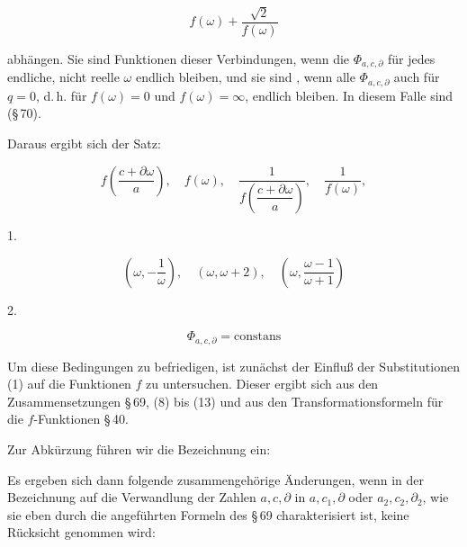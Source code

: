 
\[
f(\omega) + \frac{\sqrt{2}}{f(\omega)}
\]

abhängen. Sie sind  Funktionen dieser Verbindungen,
wenn die $\Phi_{a,c,\partial}$ für jedes endliche, nicht reelle $\omega$ endlich bleiben,
und sie sind , wenn alle $\Phi_{a,c,\partial}$ auch für $q = 0$, d.\,h.
für $f(\omega) = 0$ und $f(\omega) = \infty$, endlich bleiben. In diesem Falle
sind  (\S\,70).

Daraus ergibt sich der Satz:


\[
f\left(\frac{c+\partial\omega}{a}\right), \quad f(\omega), \quad \frac{1}{f\left(\dfrac{c+\partial\omega}{a}\right)}, \quad \frac{1}{f(\omega)},
\]


1. 

\[
\left(\omega, -\frac{1}{\omega}\right), \quad (\omega, \omega+2), \quad \left(\omega, \frac{\omega-1}{\omega+1}\right)
\]


2. 

\[
\Phi_{a,c,\partial} = \text{constans}
\]


Um diese Bedingungen zu befriedigen, ist zunächst der Einfluß
der Substitutionen (1) auf die Funktionen $f$ zu untersuchen.
Dieser ergibt sich aus den Zusammensetzungen \S\,69, (8) bis (13)
und aus den Transformationsformeln für die $f$-Funktionen \S\,40.

Zur Abkürzung führen wir die Bezeichnung ein:


Es ergeben sich dann folgende zusammengehörige Änderungen,
wenn in der Bezeichnung auf die Verwandlung der
Zahlen $a, c, \partial$ in $a, c_1, \partial$ oder $a_2, c_2, \partial_2$, wie sie eben durch die
angeführten Formeln des \S\,69 charakterisiert ist, keine Rücksicht
genommen wird:
